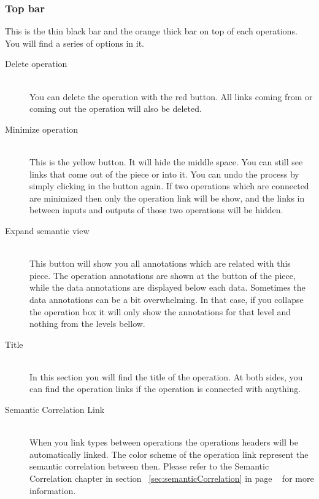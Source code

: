 \documentclass[a4paper,10pt]{article}
\begin{document}
    \subsubsection{Top bar}

    This is the thin black bar and the orange thick bar on top of each operations. You will find a series of options in it.

    \begin{description}
      \item[Delete operation] \hfill \\
      You can delete the operation with the red button. All links coming from or coming out the operation will also be deleted.

      \item[Minimize operation] \hfill \\
      This is the yellow button. It will hide the middle space. You can still see links that come out of the piece or into it. You can undo the process by simply clicking in the button again. If two operations which are connected are minimized then only the operation link will be show, and the links in between inputs and outputs of those two operations will be hidden.

      \item[Expand semantic view] \hfill \\
      This button will show you all annotations which are related with this piece. The operation annotations are shown at the button of the piece, while the data annotations are displayed below each data. Sometimes the data annotations can be a bit overwhelming. In that case, if you collapse the operation box it will only show the annotations for that level and nothing from the levels bellow.

      \item[Title] \hfill \\
      In this section you will find the title of the operation. At both sides, you can find the operation links if the operation is connected with anything.

      \item[Semantic Correlation Link] \hfill \\
      When you link types between operations the operations headers will be automatically linked. The color scheme of the operation link represent the semantic correlation between then. Please refer to the Semantic Correlation chapter in section ~\ref{sec:semanticCorrelation} in page ~\pageref{sec:semanticCorrelation} for more information.
    \end{description}
\end{document}
